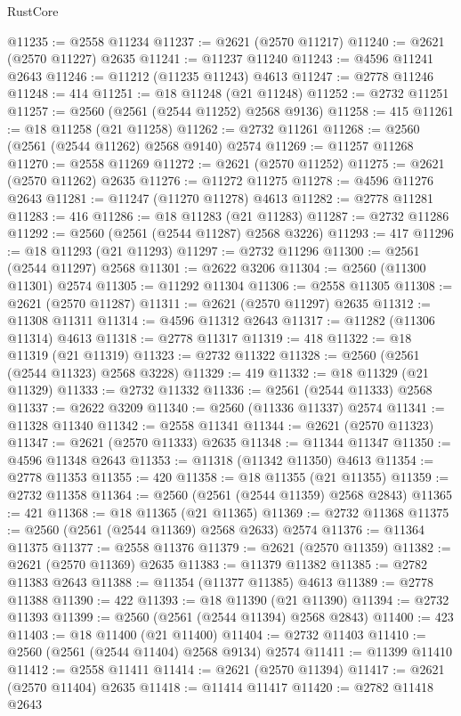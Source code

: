 \begin{lexlean}{RustCore}
\begin{coremodule}
@11235 := @2558 @11234
@11237 := @2621 (@2570 @11217)
@11240 := @2621 (@2570 @11227) @2635
@11241 := @11237 @11240
@11243 := @4596 @11241 @2643
@11246 := @11212 (@11235 @11243) @4613
@11247 := @2778 @11246
@11248 := 414
@11251 := @18 @11248 (@21 @11248)
@11252 := @2732 @11251
@11257 := @2560 (@2561 (@2544 @11252) @2568 @9136)
@11258 := 415
@11261 := @18 @11258 (@21 @11258)
@11262 := @2732 @11261
@11268 := @2560 (@2561 (@2544 @11262) @2568 @9140) @2574
@11269 := @11257 @11268
@11270 := @2558 @11269
@11272 := @2621 (@2570 @11252)
@11275 := @2621 (@2570 @11262) @2635
@11276 := @11272 @11275
@11278 := @4596 @11276 @2643
@11281 := @11247 (@11270 @11278) @4613
@11282 := @2778 @11281
@11283 := 416
@11286 := @18 @11283 (@21 @11283)
@11287 := @2732 @11286
@11292 := @2560 (@2561 (@2544 @11287) @2568 @3226)
@11293 := 417
@11296 := @18 @11293 (@21 @11293)
@11297 := @2732 @11296
@11300 := @2561 (@2544 @11297) @2568
@11301 := @2622 @3206
@11304 := @2560 (@11300 @11301) @2574
@11305 := @11292 @11304
@11306 := @2558 @11305
@11308 := @2621 (@2570 @11287)
@11311 := @2621 (@2570 @11297) @2635
@11312 := @11308 @11311
@11314 := @4596 @11312 @2643
@11317 := @11282 (@11306 @11314) @4613
@11318 := @2778 @11317
@11319 := 418
@11322 := @18 @11319 (@21 @11319)
@11323 := @2732 @11322
@11328 := @2560 (@2561 (@2544 @11323) @2568 @3228)
@11329 := 419
@11332 := @18 @11329 (@21 @11329)
@11333 := @2732 @11332
@11336 := @2561 (@2544 @11333) @2568
@11337 := @2622 @3209
@11340 := @2560 (@11336 @11337) @2574
@11341 := @11328 @11340
@11342 := @2558 @11341
@11344 := @2621 (@2570 @11323)
@11347 := @2621 (@2570 @11333) @2635
@11348 := @11344 @11347
@11350 := @4596 @11348 @2643
@11353 := @11318 (@11342 @11350) @4613
@11354 := @2778 @11353
@11355 := 420
@11358 := @18 @11355 (@21 @11355)
@11359 := @2732 @11358
@11364 := @2560 (@2561 (@2544 @11359) @2568 @2843)
@11365 := 421
@11368 := @18 @11365 (@21 @11365)
@11369 := @2732 @11368
@11375 := @2560 (@2561 (@2544 @11369) @2568 @2633) @2574
@11376 := @11364 @11375
@11377 := @2558 @11376
@11379 := @2621 (@2570 @11359)
@11382 := @2621 (@2570 @11369) @2635
@11383 := @11379 @11382
@11385 := @2782 @11383 @2643
@11388 := @11354 (@11377 @11385) @4613
@11389 := @2778 @11388
@11390 := 422
@11393 := @18 @11390 (@21 @11390)
@11394 := @2732 @11393
@11399 := @2560 (@2561 (@2544 @11394) @2568 @2843)
@11400 := 423
@11403 := @18 @11400 (@21 @11400)
@11404 := @2732 @11403
@11410 := @2560 (@2561 (@2544 @11404) @2568 @9134) @2574
@11411 := @11399 @11410
@11412 := @2558 @11411
@11414 := @2621 (@2570 @11394)
@11417 := @2621 (@2570 @11404) @2635
@11418 := @11414 @11417
@11420 := @2782 @11418 @2643

\end{coremodule}
\end{lexlean}
